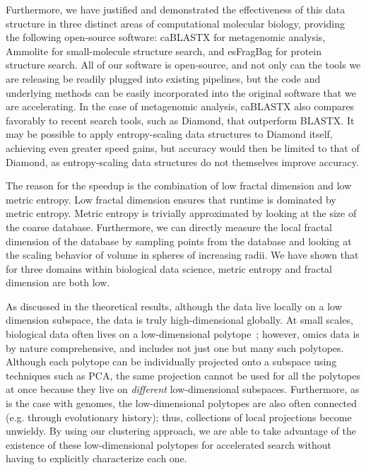 \documentclass[review,preprint,12pt]{elsarticle}
\renewcommand{\cite}{\citep} %
\theoremstyle{definition}
\theoremstyle{remark}
\numberwithin{equation}{section}
\begin{document}
Furthermore, we have justified and demonstrated the effectiveness of this data structure in
three distinct areas of computational molecular biology, providing the
following open-source software: caBLASTX for metagenomic analysis, Ammolite for
small-molecule structure search, and esFragBag for protein structure search.
All of our software is open-source, and not only can the tools we are 
releasing be readily plugged into existing pipelines, but the code and 
underlying methods can be easily incorporated into the original 
software that we are accelerating.
In the case of metagenomic analysis, caBLASTX also compares favorably to recent 
search tools, such as Diamond, that outperform BLASTX.
It may be possible to apply entropy-scaling data
structures to Diamond itself, achieving even greater speed gains, but
accuracy would then be limited to that of Diamond,
as entropy-scaling data structures do not themselves 
improve accuracy.

The reason for the speedup is the combination of low fractal dimension and low metric entropy.
Low fractal dimension ensures that runtime is dominated by metric entropy.
Metric entropy is trivially approximated by looking at the size of the coarse database.
Furthermore, we can directly measure the local fractal dimension of the database by sampling points from the database and looking at the scaling behavior of volume in spheres of increasing radii.
We have shown that for three domains within biological data science, metric entropy and fractal dimension are both low.

As discussed in the theoretical results, although the data live locally on a 
low dimension subspace, the data is truly high-dimensional globally.
At small scales, biological data often lives on a low-dimensional polytope~\cite{hart2015inferring}; however, omics data is by nature comprehensive, and includes not just one but many such polytopes.
Although each polytope can be individually projected onto a subspace using techniques such as PCA, the same projection cannot be used for all the polytopes at once because they live on \textit{different} low-dimensional 
subspaces.
Furthermore, as is the case with genomes, the low-dimensional polytopes are also often connected (e.g. through evolutionary history); thus, collections of local projections become unwieldy.
By using our clustering approach, we are able to take advantage of the existence of these low-dimensional polytopes for accelerated search without having to explicitly characterize each one.
\end{document}
